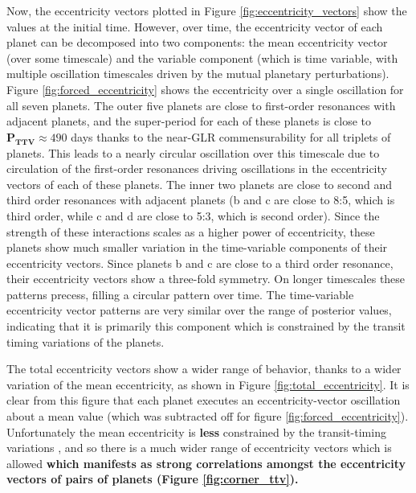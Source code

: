 \documentclass[twocolumn]{aastex63}
\begin{document}
Now, the eccentricity vectors plotted in Figure \ref{fig:eccentricity_vectors} show the
values at the initial time. However, over time, the eccentricity vector of each planet can be decomposed into two components: the mean eccentricity vector (over some timescale) and the variable component (which is time variable, with multiple oscillation timescales driven by the mutual planetary perturbations).   Figure \ref{fig:forced_eccentricity}
shows the eccentricity over a single oscillation for all seven planets.  The outer five
planets are close to first-order resonances with adjacent planets, and the super-period
for each of these planets is close to $\mathbf{P_{TTV}{\approx}}490$ days thanks to the near-GLR commensurability
for all triplets of planets.  This leads to a nearly circular oscillation over this timescale
due to circulation of the first-order resonances driving oscillations in the eccentricity
vectors of each of these planets.  The inner two planets are close to second and third
order resonances with adjacent planets (b and c are close to 8:5, which is third order,
while c and d are close to 5:3, which is second order).  Since the strength of these
interactions scales as a higher power of eccentricity, these planets show much smaller variation
in the time-variable components of their eccentricity vectors.  Since planets b and c are
close to a third order resonance,
their eccentricity vectors show a three-fold symmetry.  On longer timescales these patterns
precess, filling a circular pattern over time.  The time-variable eccentricity vector patterns are
very similar over the range of posterior values, indicating that it is primarily this
component which is constrained by the transit timing variations of the planets.

The total eccentricity vectors show a wider range of behavior, thanks to a wider variation
of the mean eccentricity, as shown in Figure \ref{fig:total_eccentricity}.  It is clear
from this figure that each planet executes an eccentricity-vector oscillation about a
mean value (which was subtracted off for figure \ref{fig:forced_eccentricity}).  Unfortunately the mean eccentricity is \textbf{less} constrained by the transit-timing
variations \textbf{\citep{Linial2018}}, and so there is a much wider range of eccentricity vectors which is allowed
\textbf{which manifests as strong correlations amongst the eccentricity vectors of pairs of
planets (Figure \ref{fig:corner_ttv}).}
\end{document}
